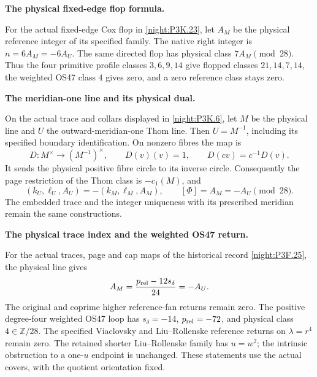 \begin{proposition}\hypertarget{tag-01U2}{}\label{iv:correction:P3K.23}

\textbf{The physical fixed-edge flop formula.}\par
For the actual fixed-edge Cox flop in
\cref{night:P3K.23}, let \(A_M\) be the physical reference integer
of its specified family. The native right integer is
\(n=6A_M=-6A_U\). The same directed flop has physical class
\(7A_M\pmod{28}\). Thus the four primitive profile classes
\(3,6,9,14\) give flopped classes \(21,14,7,14\), the weighted
OS47 class \(4\) gives zero, and a zero reference class stays zero.
\end{proposition}

\begin{proposition}\hypertarget{tag-01US}{}\label{iv:correction:P3K.6}

\textbf{The meridian-one line and its physical dual.}\par
On the actual trace and collars displayed in
\cref{night:P3K.6}, let \(M\) be the physical line and \(U\) the
outward-meridian-one Thom line. Then \(U=M^{-1}\), including its
specified boundary identification. On nonzero fibres the map is
\[
 D:M^\times\longrightarrow (M^{-1})^\times,
 \qquad D(v)(v)=1,\qquad D(cv)=c^{-1}D(v).
\]
It sends the physical positive fibre circle to its inverse circle.
Consequently the page restriction of the Thom class is \(-c_1(M)\),
and
\[
 (k_U,\ell_U,A_U)=-(k_M,\ell_M,A_M),\qquad [\Phi]=A_M=-A_U\pmod{28}.
\]
The embedded trace and the integer uniqueness with its prescribed
meridian remain the same constructions.
\end{proposition}

\begin{proposition}\hypertarget{tag-01TX}{}\label{iv:correction:P3F.25}

\textbf{The physical trace index and the weighted OS47 return.}\par
For the actual traces, page and cap maps of the historical record
\cref{night:P3F.25}, the physical line gives
\[
 A_M=\frac{p_{\rm rel}-12s_\delta}{24}=-A_U.
\]
The original and coprime higher reference-fan returns remain zero.
The positive degree-four weighted OS47 loop has
\(s_\delta=-14\), \(p_{\rm rel}=-72\), and physical class \(4\in\mathbb Z/28\).
The specified Viaclovsky and Liu--Rollenske reference returns on
\(\lambda=r^4\) remain zero.  The retained shorter Liu--Rollenske family
has \(u=w^2\); the intrinsic obstruction to a one-\(u\) endpoint is
unchanged. These statements use the actual covers, with the quotient
orientation fixed.
\end{proposition}

